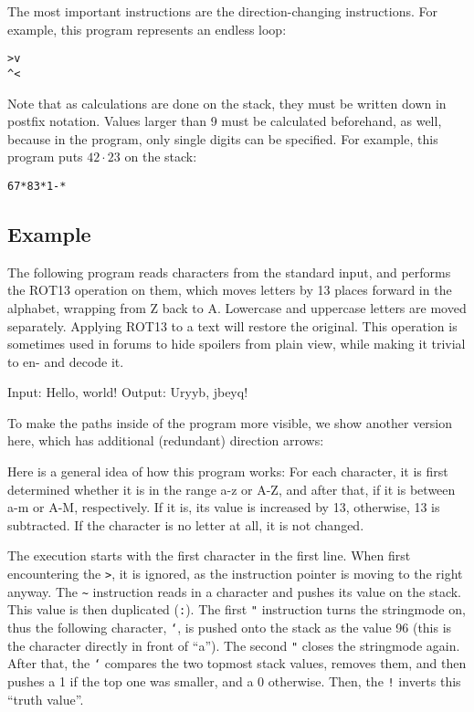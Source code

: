 The most important instructions are the direction-changing instructions. For example, this program represents an endless loop:

\begin{lstlisting}
>v
^<
\end{lstlisting}

Note that as calculations are done on the stack, they must be written down in postfix notation. Values larger than 9 must be calculated beforehand, as well, because in the program, only single digits can be specified. For example, this program puts $42\cdot 23$ on the stack:

\begin{lstlisting}
67*83*1-*
\end{lstlisting}

\subsection{Example}

The following program reads characters from the standard input, and performs the ROT13 operation on them, which moves letters by 13 places forward in the alphabet, wrapping from Z back to A. Lowercase and uppercase letters are moved separately. Applying ROT13 to a text will restore the original. This operation is sometimes used in forums to hide spoilers from plain view, while making it trivial to en- and decode it.



\begin{io}
Input: Hello, world!
Output: Uryyb, jbeyq!
\end{io}

To make the paths inside of the program more visible, we show another version here, which has additional (redundant) direction arrows:



Here is a general idea of how this program works: For each character, it is first determined whether it is in the range a-z or A-Z, and after that, if it is between a-m or A-M, respectively. If it is, its value is increased by 13, otherwise, 13 is subtracted. If the character is no letter at all, it is not changed.

The execution starts with the first character in the first line. When first encountering the \texttt{>}, it is ignored, as the instruction pointer is moving to the right anyway. The \texttt{\~} instruction reads in a character and pushes its \ascii{} value on the stack. This value is then duplicated (\texttt{:}). The first \texttt{"} instruction turns the stringmode on, thus the following character, \texttt{`}, is pushed onto the stack as the value 96 (this is the character directly in front of “a”). The second \texttt{"} closes the stringmode again. After that, the \texttt{`} compares the two topmost stack values, removes them, and then pushes a 1 if the top one was smaller, and a 0 otherwise. Then, the \texttt{!} inverts this “truth value”.

